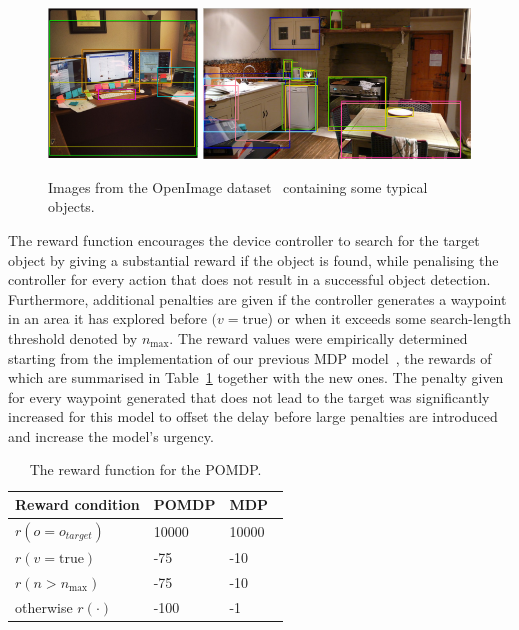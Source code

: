 \documentclass[runningheads]{llncs}
\DeclareRobustCommand{\tofix}[1]{{\sethlcolor{yellow}\hl{[#1]}}}
\begin{document}
\begin{figure}[t]
  \centering
  \includegraphics[height=4cm]{figures/desk_example.png} \hfil
  \includegraphics[height=4cm]{figures/kitchen_example_thicc.png}
  \caption{Images from the OpenImage dataset~\cite{openimages} containing some typical objects.}\label{fig:openimage}
\end{figure}

The reward function encourages the device controller to search for the target object by giving a substantial reward if the object is found, while penalising the controller for every action that does not result in a successful object detection.
Furthermore, additional penalties are given if the controller generates a waypoint in an area it has explored before $(v = \textrm{true}$) or when it exceeds some search-length threshold denoted by $n_{\max}$.
The reward values were empirically determined starting from the implementation of our previous MDP model~\cite{lock2019active}, the rewards of which are summarised in Table~\ref{tab:rewards} together with the new ones. %
The penalty given for every waypoint generated that does not lead to the target was significantly increased for this model to offset the delay before large penalties are introduced and increase the model's urgency. 

\begin{table}[t]
  \centering
  \caption{The reward function for the POMDP. }\label{tab:rewards}
  \begin{tabular}{p{3cm}p{2cm}p{2cm}}
    \toprule
    Reward condition        & POMDP  & MDP~\cite{lock2019active}   \\ \midrule
    $r(o = o_{target})$     & 10000  & 10000 \\ 
    $r(v = \textrm{true})$  & -75    & -10   \\
    $r(n > n_{\max})$       & -75    & -10   \\
    otherwise $r(\cdot)$    & -100   & -1    \\
    \bottomrule
  \end{tabular}
\end{table}
\end{document}
